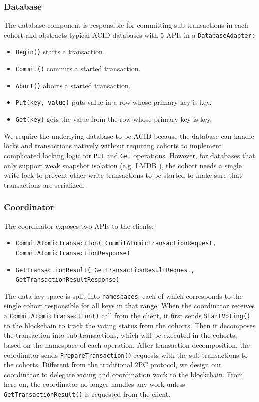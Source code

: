\documentclass[11pt,conference]{IEEEtran}
\begin{document}
\subsubsection{Database} \label{database}
The database component is responsible for committing sub-transactions in each cohort and abstracts typical ACID databases with 5 APIs in a \texttt{DatabaseAdapter:} 
\begin{itemize}
  \item \texttt{Begin()} starts a transaction.
  \item \texttt{Commit()} commits a started transaction.
  \item \texttt{Abort()} aborts a started transaction.
  \item \texttt{Put(key, value)} puts value in a row whose primary key is key.
  \item \texttt{Get(key)} gets the value from the row whose primary key is key.
\end{itemize}

We require the underlying database to be ACID because the database can handle locks and transactions natively without requiring cohorts to implement complicated locking logic for \texttt{Put} and \texttt{Get} operations. However, for databases that only support weak snapshot isolation (e.g. LMDB \cite{henry2019howard}), the cohort needs a single write lock to prevent other write transactions to be started to make sure that transactions are serialized. 

\subsubsection{Coordinator} \label{coordinator}
The coordinator exposes two APIs to the clients:
\begin{itemize}
  \item \texttt{CommitAtomicTransaction( CommitAtomicTransactionRequest, CommitAtomicTransactionResponse)}
  \item \texttt{GetTransactionResult( GetTransactionResultRequest, GetTransactionResultResponse)}
\end{itemize}   

The data key space is split into \texttt{namespaces}, each of which corresponds to the single cohort responsible for all keys in that range. When the coordinator receives a \texttt{CommitAtomicTransaction()} call from the client, it first sends \texttt{StartVoting()} to the blockchain to track the voting status from the cohorts. Then it decomposes the transaction into sub-transactions, which will be executed in the cohorts, based on the namespace of each operation. After transaction decomposition, the coordinator sends \texttt{PrepareTransaction()} requests with the sub-transactions to the cohorts. Different from the traditional 2PC protocol, we design our coordinator to delegate voting and coordination work to the blockchain. From here on, the coordinator no longer handles any work unless \texttt{GetTransactionResult()} is requested from the client.
\end{document}
